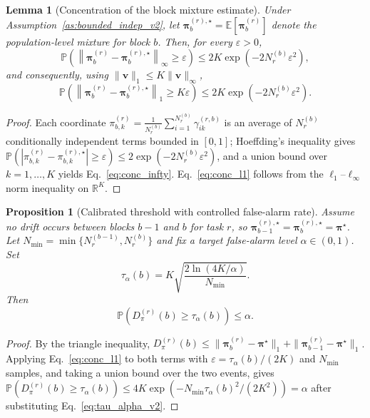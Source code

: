 ﻿\documentclass[12pt,a4paper]{article}
\newtheorem{proposition}{Proposition}
\newtheorem{lemma}{Lemma}
\newcommand{\E}{\mathbb{E}}
\begin{document}
\begin{lemma}[Concentration of the block mixture estimate]
	\label{lem:hoeffding_v2}
	Under Assumption~\ref{as:bounded_indep_v2}, let
	$\bm\pi_b^{(r),\star}=\E[\bm\pi_b^{(r)}]$ denote the population-level
	mixture for block $b$. Then, for every $\varepsilon>0$,
	\begin{equation}
		\mathbb{P}\!\left(\left\|\bm\pi_b^{(r)}-\bm\pi_b^{(r),\star}\right\|_\infty\geq\varepsilon\right)
		\leq 2K\exp\!\left(-2N_r^{(b)}\varepsilon^2\right),
		\label{eq:conc_infty}
	\end{equation}
	and consequently, using $\|\mathbf v\|_1\leq K\|\mathbf v\|_\infty$,
	\begin{equation}
		\mathbb{P}\!\left(\left\|\bm\pi_b^{(r)}-\bm\pi_b^{(r),\star}\right\|_1\geq K\varepsilon\right)
		\leq 2K\exp\!\left(-2N_r^{(b)}\varepsilon^2\right).
		\label{eq:conc_l1}
	\end{equation}
\end{lemma}
\begin{proof}
	Each coordinate
	$\pi_{b,k}^{(r)}=\frac{1}{N_r^{(b)}}\sum_{i=1}^{N_r^{(b)}}\gamma_{ik}^{(r,b)}$
	is an average of $N_r^{(b)}$ conditionally independent terms bounded in
	$[0,1]$; Hoeffding's inequality gives
	$\mathbb{P}(|\pi_{b,k}^{(r)}-\pi_{b,k}^{(r),\star}|\geq\varepsilon)\leq2\exp(-2N_r^{(b)}\varepsilon^2)$,
	and a union bound over $k=1,\ldots,K$ yields Eq.~\eqref{eq:conc_infty}.
	Eq.~\eqref{eq:conc_l1} follows from the $\ell_1$--$\ell_\infty$ norm
	inequality on $\mathbb{R}^K$.
\end{proof}

\begin{proposition}[Calibrated threshold with controlled false-alarm rate]
	\label{prop:fa_v2}
	Assume no drift occurs between blocks $b-1$ and $b$ for task $r$, so
	$\bm\pi_{b-1}^{(r),\star}=\bm\pi_{b}^{(r),\star}=\bm\pi^\star$. Let
	$N_{\min}=\min\{N_r^{(b-1)},N_r^{(b)}\}$ and fix a target false-alarm
	level $\alpha\in(0,1)$. Set
	\begin{equation}
		\tau_\alpha(b) = K\sqrt{\frac{2\ln(4K/\alpha)}{N_{\min}}}.
		\label{eq:tau_alpha_v2}
	\end{equation}
	Then
	\begin{equation}
		\mathbb{P}\!\left(D_\pi^{(r)}(b)\geq\tau_\alpha(b)\right)\leq\alpha.
		\label{eq:fa_bound_v2}
	\end{equation}
\end{proposition}
\begin{proof}
	By the triangle inequality,
	$D_\pi^{(r)}(b)\leq\|\bm\pi_b^{(r)}-\bm\pi^\star\|_1+\|\bm\pi_{b-1}^{(r)}-\bm\pi^\star\|_1$.
	Applying Eq.~\eqref{eq:conc_l1} to both terms with
	$\varepsilon=\tau_\alpha(b)/(2K)$ and $N_{\min}$ samples, and taking a
	union bound over the two events, gives
	$\mathbb{P}(D_\pi^{(r)}(b)\geq\tau_\alpha(b))\leq4K\exp\!\left(-N_{\min}\tau_\alpha(b)^2/(2K^2)\right)=\alpha$
	after substituting Eq.~\eqref{eq:tau_alpha_v2}.
\end{proof}
\end{document}
